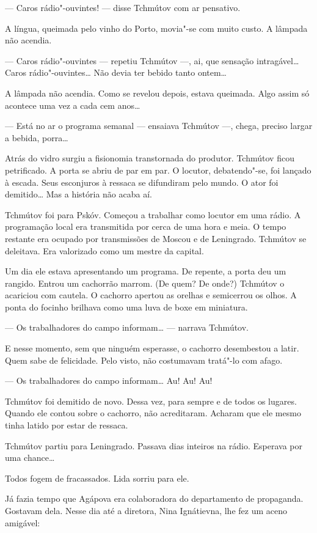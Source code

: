 --- Caros rádio"-ouvintes! --- disse Tchmútov com ar pensativo.

A língua, queimada pelo vinho do Porto, movia"-se com muito custo. A
lâmpada não acendia.

--- Caros rádio"-ouvintes --- repetiu Tchmútov ---, ai, que sensação
intragável\ldots{} Caros rádio"-ouvintes\ldots{} Não devia ter bebido tanto
ontem\ldots{}

A lâmpada não acendia. Como se revelou depois, estava queimada. Algo
assim só acontece uma vez a cada cem anos\ldots{}

--- Está no ar o programa semanal --- ensaiava Tchmútov ---, chega,
preciso largar a bebida, porra\ldots{}

Atrás do vidro surgiu a fisionomia transtornada do produtor. Tchmútov
ficou petrificado. A porta se abriu de par em par. O locutor,
debatendo"-se, foi lançado à escada. Seus esconjuros à ressaca se
difundiram pelo mundo. O ator foi demitido\ldots{} Mas a história não acaba
aí.

Tchmútov foi para Pskóv. Começou a trabalhar como locutor em uma rádio.
A programação local era transmitida por cerca de uma hora e meia. O
tempo restante era ocupado por transmissões de Moscou e de Leningrado.
Tchmútov se deleitava. Era valorizado como um mestre da capital.

Um dia ele estava apresentando um programa. De repente, a porta deu um
rangido. Entrou um cachorrão marrom. (De quem? De onde?) Tchmútov o
acariciou com cautela. O cachorro apertou as orelhas e semicerrou os
olhos. A ponta do focinho brilhava como uma luva de boxe em miniatura.

--- Os trabalhadores do campo informam\ldots{} --- narrava Tchmútov.

E nesse momento, sem que ninguém esperasse, o cachorro desembestou a
latir. Quem sabe de felicidade. Pelo visto, não costumavam tratá"-lo com
afago.

--- Os trabalhadores do campo informam\ldots{} Au! Au! Au!

Tchmútov foi demitido de novo. Dessa vez, para sempre e de todos os
lugares. Quando ele contou sobre o cachorro, não acreditaram. Acharam
que ele mesmo tinha latido por estar de ressaca.

Tchmútov partiu para Leningrado. Passava dias inteiros na rádio.
Esperava por uma chance\ldots{}

Todos fogem de fracassados. Lida sorriu para ele.

Já fazia tempo que Agápova era colaboradora do departamento de
propaganda. Gostavam dela. Nesse dia até a diretora, Nina Ignátievna,
lhe fez um aceno amigável:


